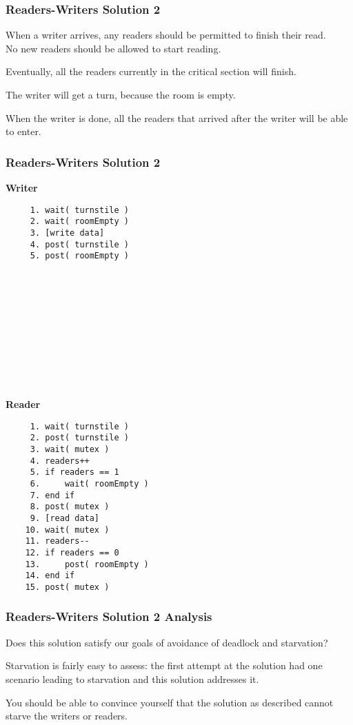 \begin{frame}
	\frametitle{Readers-Writers Solution 2}

	When a writer arrives, any readers should be permitted to finish their read.\\
	\quad No new readers should be allowed to start reading.

	Eventually, all the readers currently in the critical section will finish.

	The writer will get a turn, because the room is empty.

	When the writer is done, all the readers that arrived after the writer will be able to enter.

\end{frame}

\begin{frame}[fragile]
	\frametitle{Readers-Writers Solution 2}

	\begin{multicols}{2}
		\textbf{Writer}
		\begin{verbatim}
	 1. wait( turnstile )
	 2. wait( roomEmpty )
	 3. [write data]
	 4. post( turnstile )
	 5. post( roomEmpty )



	 
	 
	 
	 
	 
	 
	 
	 
		\end{verbatim}
		\columnbreak
		\textbf{Reader}\vspace{-1em}
		\begin{verbatim}
	 1. wait( turnstile )
	 2. post( turnstile )
	 3. wait( mutex )
	 4. readers++
	 5. if readers == 1
	 6.     wait( roomEmpty )
	 7. end if
	 8. post( mutex )
	 9. [read data]
	10. wait( mutex )
	11. readers--
	12. if readers == 0
	13.     post( roomEmpty )
	14. end if
	15. post( mutex )
  		\end{verbatim}
	\end{multicols}

\end{frame}


\begin{frame}
	\frametitle{Readers-Writers Solution 2 Analysis}

	Does this solution satisfy our goals of avoidance of deadlock and starvation?

	Starvation is fairly easy to assess: the first attempt at the solution had one scenario leading to starvation and this solution addresses it.

	You should be able to convince yourself that the solution as described cannot starve the writers or readers.


\end{frame}


